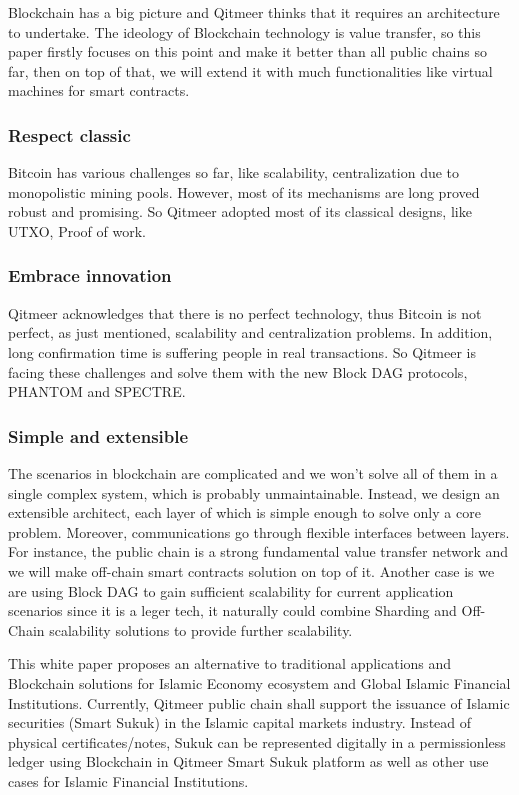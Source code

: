 \documentclass[a4paper,11pt]{article}
\begin{document}
Blockchain has a big picture and Qitmeer thinks that it requires an architecture to undertake. The ideology of Blockchain technology is value transfer, so this paper firstly focuses on this point and make it better than all public chains so far, then on top of that, we will extend it with much functionalities like virtual machines for smart contracts.

\subsubsection{Respect classic}

Bitcoin has various challenges so far, like scalability,  centralization due to monopolistic mining pools. However, most of its mechanisms are long proved robust and promising. So Qitmeer adopted most of its classical designs, like UTXO,  Proof of work.

\subsubsection{Embrace innovation}

Qitmeer acknowledges that there is no perfect technology, thus Bitcoin is not perfect, as just mentioned, scalability and centralization problems. In addition, long confirmation time is suffering people in real transactions. So Qitmeer is facing these challenges and solve them with the new Block DAG protocols, PHANTOM and SPECTRE.

\subsubsection{Simple and extensible}

The scenarios in blockchain are complicated and we won't solve all of them in a single complex system, which is probably unmaintainable. Instead, we design an extensible architect, each layer of which is simple enough to solve only a core problem. Moreover, communications go through flexible interfaces between layers. For instance, the public chain is a strong fundamental value transfer network and we will make off-chain smart contracts solution on top of it. Another case is we are using Block DAG to gain sufficient scalability for current application scenarios since it is a leger tech, it naturally could combine Sharding and Off-Chain scalability solutions to provide further scalability.

This white paper proposes an alternative to traditional applications and Blockchain solutions for Islamic Economy ecosystem and Global Islamic Financial Institutions. Currently, Qitmeer public chain shall support the issuance of Islamic securities (Smart Sukuk) in the Islamic capital markets industry. Instead of physical certificates/notes, Sukuk can be represented digitally in a  permissionless ledger using Blockchain in Qitmeer Smart Sukuk platform as well as other use cases for Islamic Financial Institutions.
\end{document}
